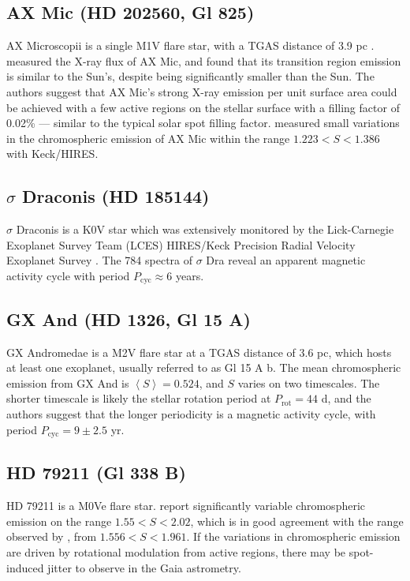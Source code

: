 \subsection{AX Mic (HD 202560, Gl 825)}

AX Microscopii is a single M1V flare star, with a TGAS distance of 3.9 pc \citep{Young1987, Byrne1981}. \citet{Byrne1989} measured the X-ray flux of AX Mic, and found that its transition region emission is similar to the Sun's, despite being significantly smaller than the Sun. The authors suggest that AX Mic's strong X-ray emission per unit surface area could be achieved with a few active regions on the stellar surface with a filling factor of 0.02\% --- similar to the typical solar spot filling factor.  \citet{Isaacson2010} measured small variations in the chromospheric emission of AX Mic within the range $1.223 < S < 1.386$ with Keck/HIRES.

\subsection{$\sigma$ Draconis (HD 185144)}

$\sigma$ Draconis is a K0V star which was extensively monitored by the Lick-Carnegie Exoplanet Survey Team (LCES) HIRES/Keck Precision Radial Velocity Exoplanet Survey \citep{Butler2017}. The 784 spectra of $\sigma$ Dra reveal an apparent magnetic activity cycle with period $P_{\mathrm{cyc}} \approx 6$ years. 

\subsection{GX And (HD 1326, Gl 15 A)}

GX Andromedae is a M2V flare star at a TGAS distance of 3.6 pc, which hosts at least one exoplanet, usually referred to as Gl 15 A b. The mean chromospheric emission from GX And is $\left< S \right> = 0.524$, and $S$ varies on two timescales. The shorter timescale is likely the stellar rotation period at $P_{\mathrm{rot}} = 44$ d, and the authors suggest that the longer periodicity is a magnetic activity cycle, with period $P_{\mathrm{cyc}} = 9 \pm 2.5$ yr. 

\subsection{HD 79211 (Gl 338 B)}

HD 79211 is a M0Ve flare star. \citet{Pace2013} report significantly variable chromospheric emission on the range $1.55 < S < 2.02$, which is in good agreement with the range observed by \citet{Isaacson2010}, from $1.556 < S < 1.961$. If the variations in chromospheric emission are driven by rotational modulation from active regions, there may be spot-induced jitter to observe in the Gaia astrometry. 

